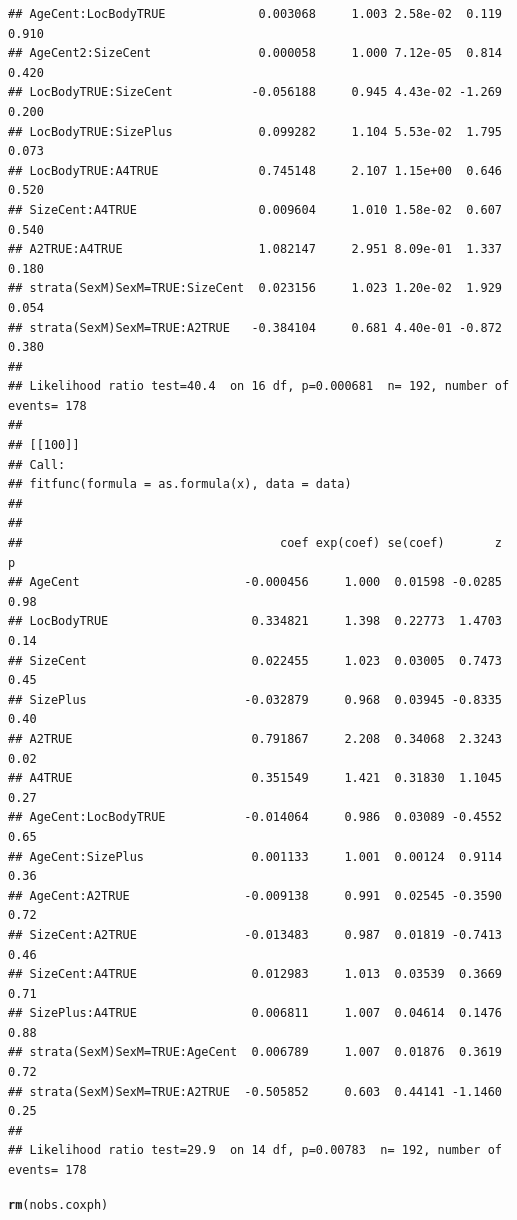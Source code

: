 \documentclass{article}\usepackage[]{graphicx}\usepackage[]{color}
\makeatletter
\newcommand{\hlstd}[1]{\textcolor[rgb]{0.345,0.345,0.345}{#1}}%
\newcommand{\hlkwd}[1]{\textcolor[rgb]{0.737,0.353,0.396}{\textbf{#1}}}%
\newenvironment{kframe}{%
 \def\at@end@of@kframe{}%
 \ifinner\ifhmode%
  \def\at@end@of@kframe{\end{minipage}}%
  \begin{minipage}{\columnwidth}%
 \fi\fi%
 \def\FrameCommand##1{\hskip\@totalleftmargin \hskip-\fboxsep
 \colorbox{shadecolor}{##1}\hskip-\fboxsep
     \hskip-\linewidth \hskip-\@totalleftmargin \hskip\columnwidth}%
 \MakeFramed {\advance\hsize-\width
   \@totalleftmargin\z@ \linewidth\hsize
   \@setminipage}}%
 {\par\unskip\endMakeFramed%
 \at@end@of@kframe}
\newenvironment{knitrout}{}{} %
\makeatother
\begin{document}
\begin{knitrout}
\begin{kframe}
\begin{verbatim}
## AgeCent:LocBodyTRUE             0.003068     1.003 2.58e-02  0.119 0.910
## AgeCent2:SizeCent               0.000058     1.000 7.12e-05  0.814 0.420
## LocBodyTRUE:SizeCent           -0.056188     0.945 4.43e-02 -1.269 0.200
## LocBodyTRUE:SizePlus            0.099282     1.104 5.53e-02  1.795 0.073
## LocBodyTRUE:A4TRUE              0.745148     2.107 1.15e+00  0.646 0.520
## SizeCent:A4TRUE                 0.009604     1.010 1.58e-02  0.607 0.540
## A2TRUE:A4TRUE                   1.082147     2.951 8.09e-01  1.337 0.180
## strata(SexM)SexM=TRUE:SizeCent  0.023156     1.023 1.20e-02  1.929 0.054
## strata(SexM)SexM=TRUE:A2TRUE   -0.384104     0.681 4.40e-01 -0.872 0.380
## 
## Likelihood ratio test=40.4  on 16 df, p=0.000681  n= 192, number of events= 178 
## 
## [[100]]
## Call:
## fitfunc(formula = as.formula(x), data = data)
## 
## 
##                                    coef exp(coef) se(coef)       z    p
## AgeCent                       -0.000456     1.000  0.01598 -0.0285 0.98
## LocBodyTRUE                    0.334821     1.398  0.22773  1.4703 0.14
## SizeCent                       0.022455     1.023  0.03005  0.7473 0.45
## SizePlus                      -0.032879     0.968  0.03945 -0.8335 0.40
## A2TRUE                         0.791867     2.208  0.34068  2.3243 0.02
## A4TRUE                         0.351549     1.421  0.31830  1.1045 0.27
## AgeCent:LocBodyTRUE           -0.014064     0.986  0.03089 -0.4552 0.65
## AgeCent:SizePlus               0.001133     1.001  0.00124  0.9114 0.36
## AgeCent:A2TRUE                -0.009138     0.991  0.02545 -0.3590 0.72
## SizeCent:A2TRUE               -0.013483     0.987  0.01819 -0.7413 0.46
## SizeCent:A4TRUE                0.012983     1.013  0.03539  0.3669 0.71
## SizePlus:A4TRUE                0.006811     1.007  0.04614  0.1476 0.88
## strata(SexM)SexM=TRUE:AgeCent  0.006789     1.007  0.01876  0.3619 0.72
## strata(SexM)SexM=TRUE:A2TRUE  -0.505852     0.603  0.44141 -1.1460 0.25
## 
## Likelihood ratio test=29.9  on 14 df, p=0.00783  n= 192, number of events= 178
\end{verbatim}
\begin{alltt}
\hlkwd{rm}\hlstd{(nobs.coxph)}
\end{alltt}
\end{kframe}
\end{knitrout}
\end{document}
